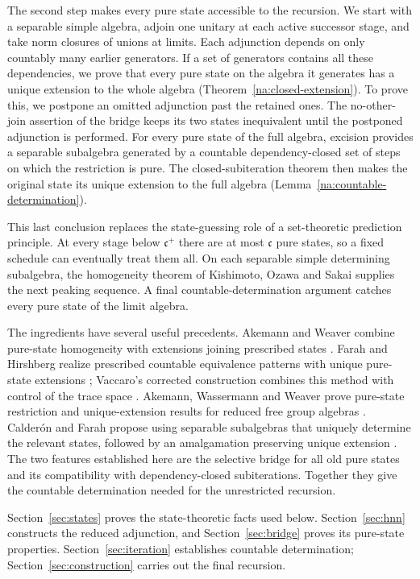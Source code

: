 The second step makes every pure state accessible to the recursion.
We start with a separable simple algebra, adjoin one unitary at each
active successor stage, and take norm closures of unions at limits.
Each adjunction depends on only countably many earlier generators.
If a set of generators contains all these dependencies, we prove that
every pure state on the algebra it generates has a unique extension
to the whole algebra (Theorem~\ref{na:closed-extension}). To prove this,
we postpone an omitted adjunction past the retained ones. The
no-other-join assertion of the bridge keeps its two states inequivalent
until the postponed adjunction is performed. For every pure state of
the full algebra, excision provides a separable subalgebra generated
by a countable dependency-closed set of steps on which the restriction
is pure. The closed-subiteration theorem then makes the original state
its unique extension to the full algebra
(Lemma~\ref{na:countable-determination}).

This last conclusion replaces the state-guessing role of a
set-theoretic prediction principle. At every stage below
$\mathfrak c^+$ there are at most $\mathfrak c$ pure states, so a fixed
schedule can eventually treat them all. On each separable simple
determining subalgebra, the homogeneity theorem of Kishimoto, Ozawa and
Sakai \cite{KishimotoOzawaSakai2003} supplies the next peaking sequence.
A final countable-determination argument catches every pure state of
the limit algebra.

The ingredients have several useful precedents. Akemann and Weaver
combine pure-state homogeneity with extensions joining prescribed
states \cite[Corollary~3]{AkemannWeaver2004}. Farah and Hirshberg realize prescribed countable equivalence patterns
with unique pure-state extensions
\cite[Lemma~2.3]{FarahHirshberg2017}; Vaccaro's corrected construction
combines this method with control of the trace space
\cite{Vaccaro2018,Vaccaro2020}.
Akemann, Wassermann and
Weaver prove pure-state restriction and unique-extension results for
reduced free group algebras
\cite[Proposition~2.3 and Theorem~2.6]{AkemannWassermannWeaver2010}.
Calder\'on and Farah propose using separable subalgebras that uniquely
determine the relevant states, followed by an amalgamation preserving
unique extension \cite[Section~8, especially Question~8.1]{CalderonFarah2022}.
The two features established here are the selective bridge for all
old pure states and its compatibility with dependency-closed subiterations.
Together they give the countable determination needed for the
unrestricted recursion.

Section~\ref{sec:states} proves the state-theoretic facts used below.
Section~\ref{sec:hnn} constructs the reduced adjunction, and
Section~\ref{sec:bridge} proves its pure-state properties.
Section~\ref{sec:iteration} establishes countable determination;
Section~\ref{sec:construction} carries out the final recursion.

